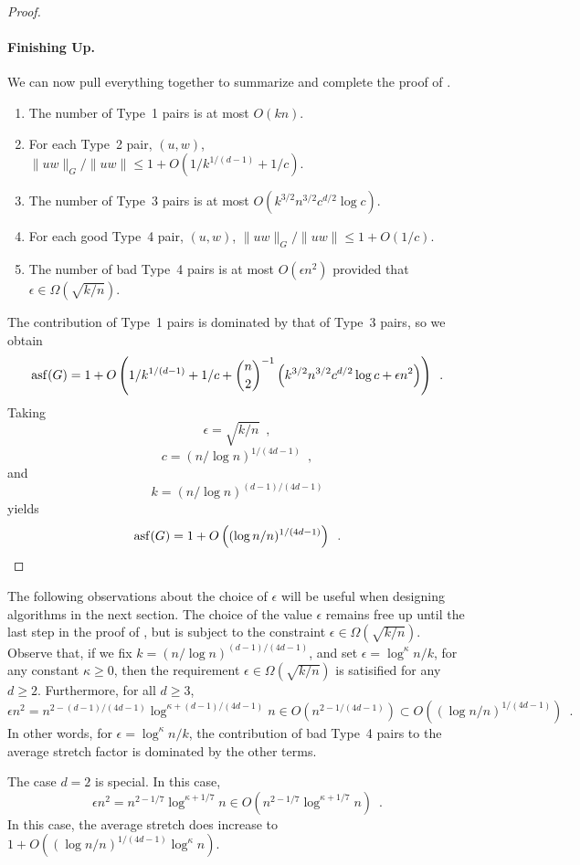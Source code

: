 \documentclass{patmorin}
\DeclareMathOperator{\asf}{asf}
\begin{document}
\begin{proof}
  \paragraph{Finishing Up.}
  We can now pull everything together to summarize and complete the proof
  of .
  \begin{enumerate}
    \item The number of Type~1 pairs is at most $O(kn)$.
    \item For each Type~2 pair, $(u,w)$, 
      $\|uw\|_G/\|uw\|\le 1+ O(1/k^{1/(d-1)}+1/c)$.
    \item The number of Type~3 pairs is at most
      $O(k^{3/2}n^{3/2}c^{d/2}\log c)$.
    \item For each good Type~4 pair, $(u,w)$, 
      $\|uw\|_G/\|uw\|\le 1+ O(1/c)$.
    \item The number of bad Type~4 pairs is at most 
       $O(\epsilon n^2)$ provided that $\epsilon \in \Omega(\sqrt{k/n})$.
  \end{enumerate}
  The contribution of Type~1 pairs is dominated by that of Type~3 pairs,
  so we obtain
  \begin{equation}\eqlabel{master-asf}
     \asf(G) = 1 + O\left(1/k^{1/(d-1)} + 1/c 
       + \binom{n}{2}^{-1}\left(k^{3/2}n^{3/2}c^{d/2}\log c
             +\epsilon n^2\right)\right) \enspace .
  \end{equation}
  Taking 
  \[ 
       \epsilon = \sqrt{k/n} \enspace ,
  \]
  \[ 
       c = (n/\log n)^{1/(4d-1)} \enspace ,
  \]
  and
  \[
       k = (n/\log n)^{(d-1)/(4d-1)} 
  \]
  yields
  \[
     \asf(G) = 1+ O\left((\log n/n)^{1/(4d-1)}\right) \enspace . \qedhere
  \]
\end{proof}

\begin{rem}
   The following observations about the choice of $\epsilon$ will be
   useful when designing algorithms in the next section.  The choice
   of the value $\epsilon$ remains free up until the last step in the
   proof of , but is subject to the constraint
   $\epsilon \in\Omega(\sqrt{k/n})$.  Observe that, if we fix $k=(n/\log
   n)^{(d-1)/(4d-1)}$, and set $\epsilon = \log^\kappa n/k$, for
   any constant $\kappa \ge 0$, then the requirement $\epsilon \in
   \Omega(\sqrt{k/n})$ is satisified for any $d\ge 2$.  Furthermore,
   for all $d \ge 3$,
   \[
      \epsilon n^2 = n^{2-(d-1)/(4d-1)}\log^{\kappa+(d-1)/(4d-1)} n 
       \in O(n^{2-1/(4d-1)}) \subset O((\log n/n)^{1/(4d-1)}) \enspace .
   \]
   In other words, for $\epsilon = \log^\kappa n/k$, the contribution
   of bad Type~4 pairs to the average stretch factor is dominated by the
   other terms.

   The case $d=2$ is special.  In this case, 
   \[ \epsilon n^2 = n^{2-1/7}\log^{\kappa+1/7} n
        \in O(n^{2-1/7}\log^{\kappa+1/7} n)  \enspace .
   \]
   In this case, the average stretch does increase to
   $1+O((\log n/n)^{1/(4d-1)}\log^{\kappa} n)$.
\end{rem}
\end{document}
